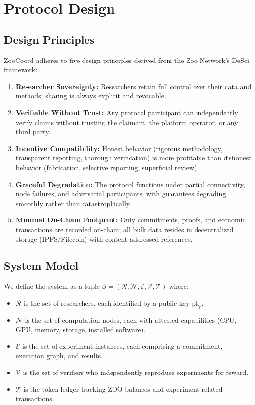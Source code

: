 \section{Protocol Design}

\label{sec:protocol}

\subsection{Design Principles}

ZooCoord adheres to five design principles derived from the Zoo Network's DeSci framework:

\begin{enumerate}[leftmargin=*]
    \item \textbf{Researcher Sovereignty:} Researchers retain full control over their data and methods; sharing is always explicit and revocable.
    \item \textbf{Verifiable Without Trust:} Any protocol participant can independently verify claims without trusting the claimant, the platform operator, or any third party.
    \item \textbf{Incentive Compatibility:} Honest behavior (rigorous methodology, transparent reporting, thorough verification) is more profitable than dishonest behavior (fabrication, selective reporting, superficial review).
    \item \textbf{Graceful Degradation:} The protocol functions under partial connectivity, node failures, and adversarial participants, with guarantees degrading smoothly rather than catastrophically.
    \item \textbf{Minimal On-Chain Footprint:} Only commitments, proofs, and economic transactions are recorded on-chain; all bulk data resides in decentralized storage (IPFS/Filecoin) with content-addressed references.
\end{enumerate}

\subsection{System Model}

We define the system as a tuple $\mathcal{S} = (\mathcal{R}, \mathcal{N}, \mathcal{E}, \mathcal{V}, \mathcal{T})$ where:

\begin{itemize}[leftmargin=*]
    \item $\mathcal{R}$ is the set of researchers, each identified by a public key $\text{pk}_r$.
    \item $\mathcal{N}$ is the set of computation nodes, each with attested capabilities (CPU, GPU, memory, storage, installed software).
    \item $\mathcal{E}$ is the set of experiment instances, each comprising a commitment, execution graph, and results.
    \item $\mathcal{V}$ is the set of verifiers who independently reproduce experiments for reward.
    \item $\mathcal{T}$ is the token ledger tracking ZOO balances and experiment-related transactions.
\end{itemize}

